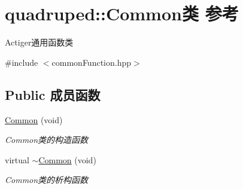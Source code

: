 \hypertarget{classquadruped_1_1Common}{}\section{quadruped\+:\+:Common类 参考}
\label{classquadruped_1_1Common}


Actiger通用函数类  




{\ttfamily \#include $<$common\+Function.\+hpp$>$}

\subsection*{Public 成员函数}
\begin{DoxyCompactItemize}
\item 
\mbox{\label{classquadruped_1_1Common_a238749d318a2208574129c4aa5477cda}} 
\hyperlink{classquadruped_1_1Common_a238749d318a2208574129c4aa5477cda}{Common} (void)
\begin{DoxyCompactList}\small\item\em Common类的构造函数 \end{DoxyCompactList}\item 
\mbox{\label{classquadruped_1_1Common_ae5929aa0ce32558ecb76f9593d8e0e15}} 
virtual \hyperlink{classquadruped_1_1Common_ae5929aa0ce32558ecb76f9593d8e0e15}{$\sim$\+Common} (void)
\begin{DoxyCompactList}\small\item\em Common类的析构函数 \end{DoxyCompactList}\end{DoxyCompactItemize}
